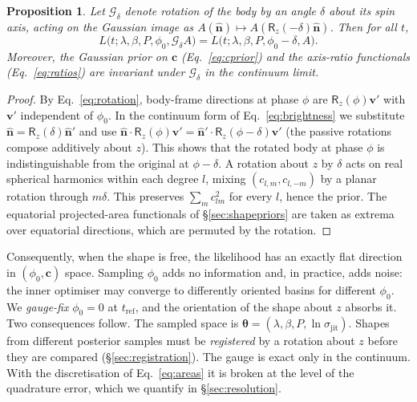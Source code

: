 \documentclass[11pt,a4paper]{article}
\newtheorem{proposition}{Proposition}
\theoremstyle{remark}
\newcommand{\vect}[1]{\bm{#1}}
\newcommand{\uv}[1]{\hat{\bm{#1}}}
\begin{document}
\begin{proposition}
\label{prop:gauge}
Let $\mathcal G_\delta$ denote rotation of the body by an angle $\delta$ about its spin axis, acting
on the Gaussian image as $A(\uv n)\mapsto A(\mathsf R_z(-\delta)\uv n)$. Then for all $t$,
\begin{equation}
  L\bigl(t;\lambda,\beta,P,\phi_0,\mathcal G_\delta A\bigr) = L\bigl(t;\lambda,\beta,P,\phi_0-\delta,A\bigr).
\end{equation}
Moreover, the Gaussian prior on $\vect c$ (Eq.~\ref{eq:cprior}) and the axis-ratio functionals
(Eq.~\ref{eq:ratios}) are invariant under $\mathcal G_\delta$ in the continuum limit.
\end{proposition}
\begin{proof}
By Eq.~\eqref{eq:rotation}, body-frame directions at phase $\phi$ are $\mathsf R_z(\phi)\vect v'$ with
$\vect v'$ independent of $\phi_0$. In the continuum form of Eq.~\eqref{eq:brightness} we substitute
$\uv n=\mathsf R_z(\delta)\uv n'$ and use $\uv n\cdot\mathsf R_z(\phi)\vect v'
=\uv n'\cdot\mathsf R_z(\phi-\delta)\vect v'$ (the passive rotations compose additively about $z$).
This shows that the rotated body at phase $\phi$ is indistinguishable from the original at
$\phi-\delta$. A rotation about $z$ by $\delta$ acts on real spherical harmonics within each degree
$l$, mixing $(c_{l,m},c_{l,-m})$ by a planar rotation through $m\delta$. This preserves
$\sum_m c_{lm}^2$ for every $l$, hence the prior. The equatorial projected-area functionals of
\S\ref{sec:shapepriors} are taken as extrema over equatorial directions, which are permuted by the
rotation.
\end{proof}

Consequently, when the shape is free, the likelihood has an exactly flat direction in
$(\phi_0,\vect c)$ space. Sampling $\phi_0$ adds no information and, in practice, adds noise: the
inner optimiser may converge to differently oriented basins for different $\phi_0$. We
\emph{gauge-fix} $\phi_0=0$ at $t_{\mathrm{ref}}$, and the orientation of the shape about $z$ absorbs
it. Two consequences follow. The sampled space is $\vect\theta=(\lambda,\beta,P,\ln\sigma_{\mathrm{jit}})$.
Shapes from different posterior samples must be \emph{registered} by a rotation about $z$ before they
are compared (\S\ref{sec:registration}). The gauge is exact only in the continuum. With the
discretisation of Eq.~\eqref{eq:areas} it is broken at the level of the quadrature error, which we
quantify in \S\ref{sec:resolution}.

\end{document}
